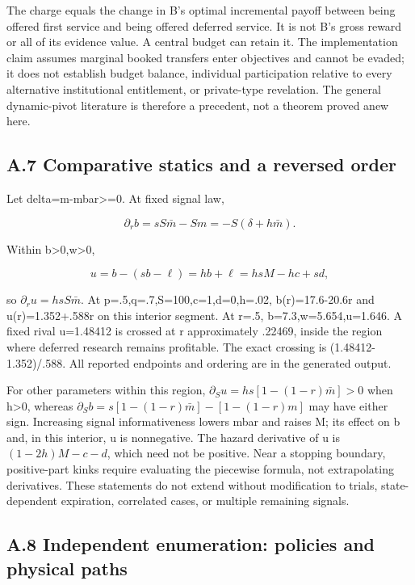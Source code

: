 \documentclass[
  11pt,
]{article}
\begin{document}
The charge equals the change in B's optimal incremental payoff between
being offered first service and being offered deferred service. It is
not B's gross reward or all of its evidence value. A central budget can
retain it. The implementation claim assumes marginal booked transfers
enter objectives and cannot be evaded; it does not establish budget
balance, individual participation relative to every alternative
institutional entitlement, or private-type revelation. The general
dynamic-pivot literature is therefore a precedent, not a theorem proved
anew here.

\subsection{A.7 Comparative statics and a reversed
order}\label{a.7-comparative-statics-and-a-reversed-order}

Let delta=m-mbar\textgreater=0. At fixed signal law,

\[\partial_r b=sS\bar m-Sm=-S(\delta+h\bar m).\]

Within b\textgreater0,w\textgreater0,

\[u=b-(sb-\ell)=hb+\ell=hsM-hc+sd,\]

so \(\partial_r u=hsS\bar m\). At p=.5,q=.7,S=100,c=1,d=0,h=.02,
b(r)=17.6-20.6r and u(r)=1.352+.588r on this interior segment. At r=.5,
b=7.3,w=5.654,u=1.646. A fixed rival u=1.48412 is crossed at r
approximately .22469, inside the region where deferred research remains
profitable. The exact crossing is (1.48412-1.352)/.588. All reported
endpoints and ordering are in the generated output.

For other parameters within this region,
\(\partial_S u=hs[1-(1-r)\bar m]>0\) when h\textgreater0, whereas
\(\partial_S b=s[1-(1-r)\bar m]-[1-(1-r)m]\) may have either sign.
Increasing signal informativeness lowers mbar and raises M; its effect
on b and, in this interior, u is nonnegative. The hazard derivative of u
is \((1-2h)M-c-d\), which need not be positive. Near a stopping
boundary, positive-part kinks require evaluating the piecewise formula,
not extrapolating derivatives. These statements do not extend without
modification to trials, state-dependent expiration, correlated cases, or
multiple remaining signals.

\subsection{A.8 Independent enumeration: policies and physical
paths}\label{a.8-independent-enumeration-policies-and-physical-paths}
\end{document}
